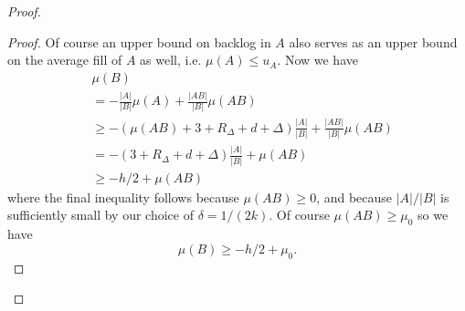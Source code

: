 \begin{proof}
\begin{proof}
  Of course an upper bound on backlog in $A$ also serves as
  an upper bound on the average fill of $A$ as well, i.e.
  $\mu(A) \le u_A$.  Now we have
  \begin{align*}
    &\mu(B) \\
           &= -\frac{|A|}{|B|} \mu(A) + \frac{|A B|}{|B|}\mu(A B) \\
           &\ge -(\mu(AB) + 3+R_\Delta+d+\Delta) \frac{|A|}{|B|} + \frac{|AB|}{|B|}\mu(AB)\\
           &= -(3+R_\Delta+d + \Delta) \frac{|A|}{|B|} + \mu(AB)\\
           &\ge -h/2 + \mu(AB)
  \end{align*}
  where the final inequality follows because $\mu(AB) \ge 0$, and
  because $|A|/|B|$ is sufficiently small by our choice of $\delta = 1/(2k)$.
  Of course $\mu(AB) \ge \mu_0$ so we have
  $$\mu(B) \ge -h/2 + \mu_0.$$

\end{proof}


\end{proof}
